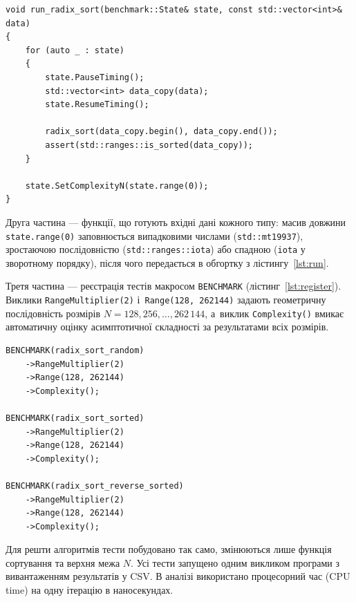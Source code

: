 \documentclass{term-paper}
\begin{document}
\begin{listing}[H]
    \begin{verbatim}
void run_radix_sort(benchmark::State& state, const std::vector<int>& data)
{
    for (auto _ : state)
    {
        state.PauseTiming();
        std::vector<int> data_copy(data);
        state.ResumeTiming();

        radix_sort(data_copy.begin(), data_copy.end());
        assert(std::ranges::is_sorted(data_copy));
    }

    state.SetComplexityN(state.range(0));
}
\end{verbatim}
    \caption{Обгортка вимірювання (на прикладі порозрядного сортування)}
    \label{lst:run}
\end{listing}

Друга частина --- функції, що готують вхідні дані кожного типу: масив
довжини \texttt{state.range(0)} заповнюється випадковими числами
(\texttt{std::mt19937}), зростаючою послідовністю (\texttt{std::ranges::iota})
або спадною (\texttt{iota} у зворотному порядку), після чого передається в
обгортку з лістингу~\ref{lst:run}.

Третя частина --- реєстрація тестів макросом \texttt{BENCHMARK}
(лістинг~\ref{lst:register}). Виклики \texttt{RangeMultiplier(2)}
і~\texttt{Range(128,~262144)} задають геометричну послідовність
розмірів $N = 128, 256, \dots, 262\,144$, а~виклик \texttt{Complexity()}
вмикає
автоматичну оцінку асимптотичної складності за результатами всіх
розмірів.

\begin{listing}[H]
    \begin{verbatim}
BENCHMARK(radix_sort_random)
    ->RangeMultiplier(2)
    ->Range(128, 262144)
    ->Complexity();

BENCHMARK(radix_sort_sorted)
    ->RangeMultiplier(2)
    ->Range(128, 262144)
    ->Complexity();

BENCHMARK(radix_sort_reverse_sorted)
    ->RangeMultiplier(2)
    ->Range(128, 262144)
    ->Complexity();
\end{verbatim}
    \caption{Реєстрація тестів з оцінкою складності}
    \label{lst:register}
\end{listing}

Для решти алгоритмів тести побудовано так само, змінюються лише функція
сортування та верхня межа $N$. Усі тести запущено одним викликом програми
з вивантаженням результатів у CSV. В аналізі використано процесорний час
(CPU time) на одну ітерацію в наносекундах.
\end{document}
